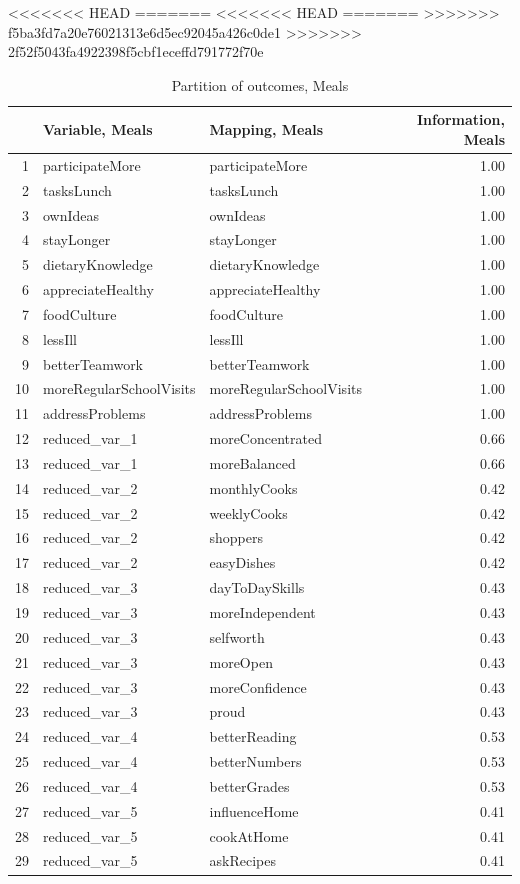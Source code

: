 \documentclass[12pt, a4paper, titlepage]{article}\usepackage[]{graphicx}\usepackage[]{color}
\begin{document}
<<<<<<< HEAD
=======
<<<<<<< HEAD
=======
>>>>>>> f5ba3fd7a20e76021313e6d5ec92045a426c0de1
>>>>>>> 2f52f5043fa4922398f5cbf1eceffd791772f70e
\begin{table}[ht]
\centering
\begin{tabular}{rllr}
  \hline
 & Variable, Meals & Mapping, Meals & Information, Meals \\ 
  \hline
1 & participateMore & participateMore & 1.00 \\ 
  2 & tasksLunch & tasksLunch & 1.00 \\ 
  3 & ownIdeas & ownIdeas & 1.00 \\ 
  4 & stayLonger & stayLonger & 1.00 \\ 
  5 & dietaryKnowledge & dietaryKnowledge & 1.00 \\ 
  6 & appreciateHealthy & appreciateHealthy & 1.00 \\ 
  7 & foodCulture & foodCulture & 1.00 \\ 
  8 & lessIll & lessIll & 1.00 \\ 
  9 & betterTeamwork & betterTeamwork & 1.00 \\ 
  10 & moreRegularSchoolVisits & moreRegularSchoolVisits & 1.00 \\ 
  11 & addressProblems & addressProblems & 1.00 \\ 
  12 & reduced\_var\_1 & moreConcentrated & 0.66 \\ 
  13 & reduced\_var\_1 & moreBalanced & 0.66 \\ 
  14 & reduced\_var\_2 & monthlyCooks & 0.42 \\ 
  15 & reduced\_var\_2 & weeklyCooks & 0.42 \\ 
  16 & reduced\_var\_2 & shoppers & 0.42 \\ 
  17 & reduced\_var\_2 & easyDishes & 0.42 \\ 
  18 & reduced\_var\_3 & dayToDaySkills & 0.43 \\ 
  19 & reduced\_var\_3 & moreIndependent & 0.43 \\ 
  20 & reduced\_var\_3 & selfworth & 0.43 \\ 
  21 & reduced\_var\_3 & moreOpen & 0.43 \\ 
  22 & reduced\_var\_3 & moreConfidence & 0.43 \\ 
  23 & reduced\_var\_3 & proud & 0.43 \\ 
  24 & reduced\_var\_4 & betterReading & 0.53 \\ 
  25 & reduced\_var\_4 & betterNumbers & 0.53 \\ 
  26 & reduced\_var\_4 & betterGrades & 0.53 \\ 
  27 & reduced\_var\_5 & influenceHome & 0.41 \\ 
  28 & reduced\_var\_5 & cookAtHome & 0.41 \\ 
  29 & reduced\_var\_5 & askRecipes & 0.41 \\ 
   \hline
\end{tabular}
\caption{Partition of outcomes, Meals} 
\end{table}
\end{document}
